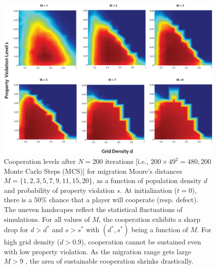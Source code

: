 
\begin{figure}[h]
\begin{center}
\centerline{\includegraphics[width=14cm]{../figures2/heatmaps.eps}}
\caption{Cooperation levels after $N=200$ iterations [i.e., $200 \times 49^2 = 480,200$ Monte Carlo Steps (MCS)] for migration Moore's distances $M = \{1,2,3,5,7,9,11,15,20 \}$, as a function of population density $d$ and probability of property violation $s$. At initialization ($t=0$), there is a $50\%$ chance that a player will cooperate (resp. defect). The uneven landscapes reflect the statistical fluctuations of simulations. For all values of $M$, the cooperation exhibits a sharp drop for $d > d^*$  and $s > s^*$ with $(d^*,s^*)$ being a function of $M$. For high grid density ($d > 0.9$), cooperation cannot be sustained even with low property violation. As the migration range gets large $M > 9$ , the area of sustainable cooperation shrinks drastically.%
}
\label{fig:heatmaps}
\end{center}
\end{figure}



